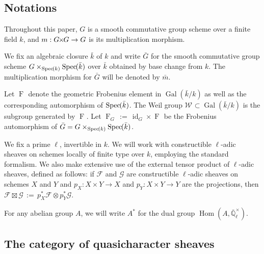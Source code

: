 \documentclass[CM,Submssn,SecEq]{degruyter-crelle} %
\theoremstyle{plain}
\theoremstyle{definition}
\theoremstyle{remark}
\newcommand{\EE}{\mathbb{\bar Q}_\ell}
\newcommand{\bFq}{\bar{k}}
\newcommand{\Fq}{k}
\newcommand{\EEx}{\EE^\times}
\newcommand{\Weil}[1]{\mathcal{W}_{#1}}
\DeclareMathOperator{\Gal}{Gal}
\newcommand{\Frob}[1]{\operatorname{F}_{#1}}
\DeclareMathOperator{\Hom}{Hom}
\DeclareMathOperator{\id}{id}
\newcommand{\Spec}[1]{{\operatorname{Spec}\hskip-1pt( #1 )}}
\newcommand{\ceq}{{\, :=\, }}
\newcommand{\bm}{\bar{m}}
\newcommand{\bG}{\bar{G}}
\newcommand{\tight}[3]{\hspace{-#1pt}{#2}\hspace{-#3pt}}
\newcommand{\GxG}{\text{$G \tight{1}{\times}{1} G$}}
\begin{document}
\subsection{Notations}\label{ssec:notation}

Throughout this paper, $G$ is a smooth commutative group scheme
over a finite field $\Fq$, and $m : \GxG\to G$ is its multiplication morphism.

We fix an algebraic closure $\bFq$ of $\Fq$ and write $\bG$ for the
smooth commutative group scheme $G \times_{\Spec{\Fq}} \Spec{\bFq}$ over $\bFq$
obtained by base change from $k$. The multiplication morphism for $\bG$ will be denoted by $\bm$.

Let $\Frob{}$ denote the geometric Frobenius element in $\Gal(\bFq/\Fq)$ as
well as the corresponding automorphism of $\Spec{\bFq}$. The Weil group
$\Weil{}\subset \Gal(\bFq/\Fq)$ is the subgroup generated by $\Frob{}$.
Let $\Frob{G} \ceq \id_{G} \times \Frob{}$ be the Frobenius automorphism of $\bG = G \times_{\Spec{\Fq}} \Spec{\bFq}$.

We fix a prime $\ell$, invertible in $\Fq$.
We will work with constructible $\ell$-adic sheaves 
on schemes locally of finite type over $\Fq$, employing the standard formalism.
We also make extensive use of the external tensor product of $\ell$-adic sheaves,
defined as follows: if $\mathcal{F}$ and $\mathcal{G}$ are constructible $\ell$-adic
sheaves on schemes $X$ and $Y$ and $p_X : X\times Y\to X$ and $p_Y : X\times Y \to Y$
are the projections, then $\mathcal{F}\boxtimes \mathcal{G} \ceq p_X^* \mathcal{F} \otimes p_Y^*\mathcal{G}$.

For any abelian group $A$, we will write $A^*$ for the dual group $\Hom(A, \EEx)$.

\subsection{The category of quasicharacter sheaves}\label{ssec:category}
\end{document}
